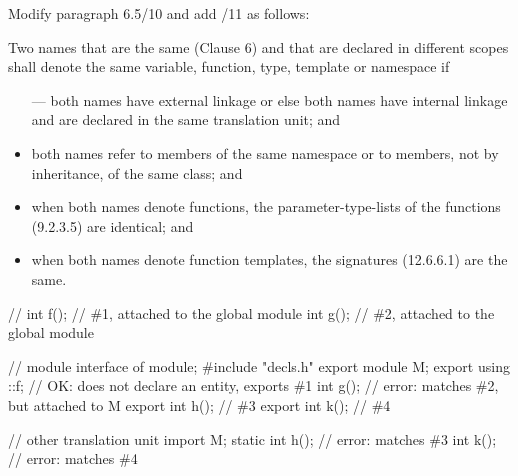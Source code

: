 \noindent
Modify paragraph 6.5/10 and add /11 as follows:
\begin{std.txt}
  \resetalinea[9]
  \alinea
  \addtocounter{footnote}{1}
  Two
  names that are the same (Clause 6) and that are declared in different scopes
  shall denote the same variable, function, type, template or namespace if
  \begin{itemize}
    \item[---] both names have external  linkage
      or else both names have internal linkage and are declared in
      the same translation unit; and

      \item both names refer to members of the same namespace or to members,
      not by inheritance, of the same class; and

      \item when both names denote functions, the parameter-type-lists of the
      functions (9.2.3.5) are identical; and

      \item when both names denote function templates, the signatures (12.6.6.1)
      are the same.
  \end{itemize}

  \alinea
  \color{addclr}
  \begin{example}
    \begin{codeblock}
      // 
      int f();            // \#1, attached to the global module
      int g();            // \#2, attached to the global module

      // module interface of 
      module;
      #include "decls.h"
      export module M;
      export using ::f;   // OK: does not declare an entity, exports \#1
      int g();            // error: matches \#2, but attached to M
      export int h();     // \#3
      export int k();     // \#4

      // other translation unit
      import M;
      static int h();     // error: matches \#3
      int k();            // error: matches \#4
    \end{codeblock}
  \end{example}
\end{std.txt}


